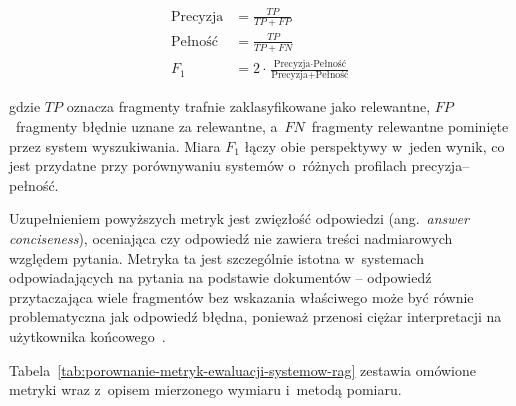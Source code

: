 \begin{align}
  \text{Precyzja} & = \frac{TP}{TP + FP} \\[4pt]
  \text{Pełność}  & = \frac{TP}{TP + FN} \\[4pt]
  F_1             & = 2 \cdot
  \frac{\text{Precyzja} \cdot \text{Pełność}}
  {\text{Precyzja} + \text{Pełność}}
\end{align}

gdzie $TP$ oznacza fragmenty trafnie zaklasyfikowane jako relewantne,
$FP$~fragmenty błędnie uznane za relewantne, a~$FN$~fragmenty relewantne
pominięte przez system wyszukiwania. Miara $F_1$ łączy obie perspektywy w~jeden
wynik, co jest przydatne przy porównywaniu systemów o~różnych profilach
precyzja--pełność.

Uzupełnieniem powyższych metryk jest zwięzłość odpowiedzi (ang.~\textit{answer
  conciseness}), oceniająca czy odpowiedź nie zawiera treści nadmiarowych
względem pytania. Metryka ta jest szczególnie istotna w~systemach
odpowiadających na pytania na podstawie dokumentów -- odpowiedź przytaczająca
wiele fragmentów bez wskazania właściwego może być równie problematyczna jak
odpowiedź błędna, ponieważ przenosi ciężar interpretacji na użytkownika
końcowego~\cite{es2024ragas}.

Tabela~\ref{tab:porownanie-metryk-ewaluacji-systemow-rag} zestawia omówione
metryki wraz z~opisem mierzonego wymiaru i~metodą pomiaru.

